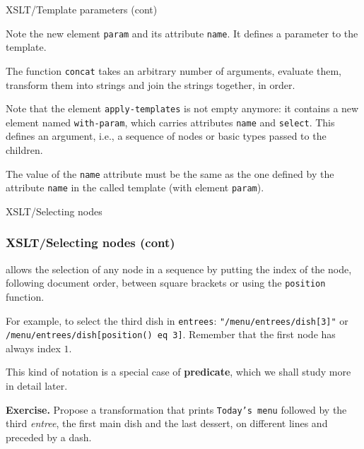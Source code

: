 %
\begin{frame}{XSLT/Template parameters (cont)}

Note the new \XSLT element \texttt{param} and its attribute
\texttt{name}. It defines a parameter to the template.

\bigskip

The function \texttt{concat} takes an arbitrary number of arguments,
evaluate them, transform them into strings and join the strings
together, in order.

\bigskip

Note that the element \texttt{apply-templates} is not empty
anymore: it contains a new \XSLT element named
\texttt{with-param}, which carries attributes
\texttt{name} and \texttt{select}. This defines an argument, i.e., a
sequence of nodes or basic types passed to the children.

\bigskip

The value of the \texttt{name} attribute must be the same as the one
defined by the attribute \texttt{name} in the called template (with
element \texttt{param}).

\end{frame}

%
\begin{frame}{XSLT/Selecting nodes}
\label{menu}


\end{frame}

%
\begin{frame}[containsverbatim]
\frametitle{XSLT/Selecting nodes (cont)}

\XSLT allows the selection of any node in a sequence by putting the
index of the node, following document order, between square brackets
or using the \texttt{position} function.

\bigskip

For example, to select the third dish in \texttt{entrees}:
\verb|"/menu/entrees/dish[3]"| or
\verb|/menu/entrees/dish[position() eq 3]|. Remember that the first
node has always index \(1\).

\bigskip

This kind of notation is a special case of \textbf{predicate}, which
we shall study more in detail later.

\bigskip

\textbf{Exercise.} Propose a transformation that prints
\texttt{Today's menu} followed by the third \emph{entree}, the first
main dish and the last dessert, on different lines and preceded by a
dash.

\end{frame}

